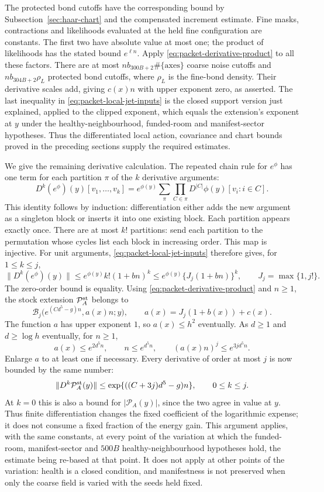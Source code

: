 The protected bond cutoffs have the corresponding bound by
Subsection~\ref{sec:haar-chart} and the compensated increment estimate.
Fine masks, contractions and likelihoods evaluated at the held fine
configuration are constants. The first two have absolute value at
most one; the product of likelihoods has the stated bound
$e^{\ell n}$. Apply \eqref{eq:packet-derivative-product} to all these
factors. There are at most $n b_{300B+2}\#\{\mathrm{axes}\}$ coarse
noise cutoffs and $n b_{304B+2}\rho_L$ protected bond cutoffs,
where $\rho_L$ is the fine-bond density. Their derivative scales
add, giving $c(x)n$ with upper exponent zero, as asserted.
The last inequality in
\eqref{eq:packet-local-jet-inputs} is the closed support version just
explained, applied to the clipped exponent, which equals the
extension's exponent at $y$ under the healthy-neighbourhood,
funded-room and manifest-sector hypotheses. Thus the differentiated local action, covariance and chart
bounds proved in the preceding sections supply the required estimates.

We give the remaining derivative calculation. The repeated chain rule
for $e^\phi$ has one term for each partition $\pi$ of the $k$ derivative
arguments:
\[
 D^k(e^\phi)(y)[v_1,\ldots,v_k]
 =e^{\phi(y)}\sum_\pi\prod_{C\in\pi}
 D^{|C|}\phi(y)[v_i:i\in C].
\]
This identity follows by induction: differentiation either adds the
new argument as a singleton block or inserts it into one existing
block. Each partition appears exactly once. There are at most $k!$
partitions: send each partition to the permutation whose cycles list
each block in increasing order. This map is injective. For unit
arguments, \eqref{eq:packet-local-jet-inputs} therefore gives, for
$1\le k\le j$,
\[
 \|D^k(e^\phi)(y)\|
 \le e^{\phi(y)}k!(1+bn)^k
 \le e^{\phi(y)}\{J_j(1+bn)\}^k,
 \qquad J_j=\max\{1,j!\}.
\]
The zero-order bound is equality. Using
\eqref{eq:packet-derivative-product} and $n\ge1$, the stock
extension $\mathcal P_A^{\rm st}$ belongs to
\[
 \mathcal B_j\bigl(e^{(C d^5-g)n},a(x)n;y\bigr),
 \qquad a(x)=J_j(1+b(x))+c(x).
\]
The function $a$ has upper exponent $1$, so $a(x)\le h^2$ eventually.
As $d\ge1$ and $d\ge\log h$ eventually, for $n\ge1$,
\[
 a(x)\le e^{2d^5n},\qquad n\le e^{d^5n},\qquad
 (a(x)n)^j\le e^{3j d^5n}.
\]
Enlarge $a$ to at least one if necessary. Every derivative of order
at most $j$ is now bounded by the same number:
\begin{equation}\label{eq:packet-jet-price}
 \|D^k\mathcal P_A^{\rm st}(y)\|
 \le\exp\{((C+3j)d^5-g)n\},\qquad 0\le k\le j.
\end{equation}
At $k=0$ this is also a bound for $|\mathcal P_A(y)|$, since the two
agree in value at $y$.
Thus finite differentiation changes the fixed coefficient of the
logarithmic expense; it does not consume a fixed fraction of the
energy gain. This argument applies, with the same constants, at every
point of the variation at which the funded-room, manifest-sector and
$500B$ healthy-neighbourhood hypotheses hold, the estimate being
re-based at that point. It does not apply at other points of the
variation: health is a closed condition, and manifestness is not
preserved when only the coarse field is varied with the seeds held
fixed.

